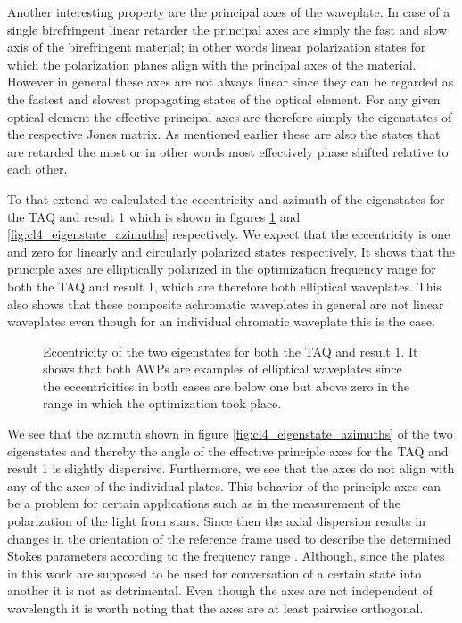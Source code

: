 Another interesting property are the principal axes of the waveplate. In case of a single birefringent linear retarder the principal axes are simply the fast and slow axis of the birefringent material; in other words linear polarization states for which the polarization planes align with the principal axes of the material. However in general these axes are not always linear since they can be regarded as the fastest and slowest propagating states of the optical element. For any given optical element the effective principal axes are therefore simply the eigenstates of the respective Jones matrix. As mentioned earlier these are also the states that are retarded the most or in other words most effectively phase shifted relative to each other. 

To that extend we calculated the eccentricity and azimuth of the eigenstates for the TAQ and result 1 which is shown in figures \ref{fig:cl4_eigenstate_eccentricity} and \ref{fig:cl4_eigenstate_azimuths} respectively. We expect that the eccentricity is one and zero for linearly and circularly polarized states respectively. It shows that the principle axes are elliptically polarized in the optimization frequency range for both the TAQ and result 1, which are therefore both elliptical waveplates. This also shows that these composite achromatic waveplates in general are not linear waveplates even though for an individual chromatic waveplate this is the case.

\begin{figure}[H]
    \centering
    
    \caption{Eccentricity of the two eigenstates for both the TAQ and result 1. It shows that both AWPs are examples of elliptical waveplates since the eccentricities in both cases are below one but above zero in the range in which the optimization took place.}
    \label{fig:cl4_eigenstate_eccentricity}
\end{figure}

We see that the azimuth shown in figure \ref{fig:cl4_eigenstate_azimuths} of the two eigenstates and thereby the angle of the effective principle axes for the TAQ and result 1 is slightly dispersive. Furthermore, we see that the axes do not align with any of the axes of the individual plates. This behavior of the principle axes can be a problem for certain applications such as in the measurement of the polarization of the light from stars. Since then the axial dispersion results in changes in the orientation of the reference frame used to describe the determined Stokes parameters according to the frequency range \cite{Clarke2004, Bailey2019}. Although, since the plates in this work are supposed to be used for conversation of a certain state into another it is not as detrimental. Even though the axes are not independent of wavelength it is worth noting that the axes are at least pairwise orthogonal.

